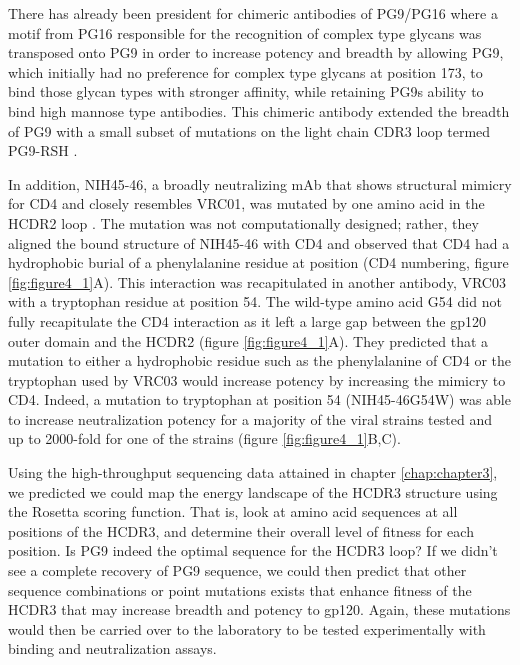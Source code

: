 There has already been president for chimeric antibodies of PG9/PG16 where a motif from PG16 responsible for the recognition of complex type glycans was transposed onto PG9 in order to increase potency and breadth by allowing PG9, which initially had no preference for complex type glycans at position 173, to bind those glycan types with stronger affinity, while retaining PG9s ability to bind high mannose type antibodies. This chimeric antibody extended the breadth of PG9 with a small subset of mutations on the light chain CDR3 loop termed PG9-RSH \citep{Pancera:2013ev}. 

In addition, NIH45-46, a broadly neutralizing mAb that shows structural mimicry for CD4 and closely resembles VRC01, was mutated by one amino acid in the HCDR2 loop \citep{Scheid:2011js,Diskin:2011hl}. The mutation was not computationally designed; rather, they aligned the bound structure of NIH45-46 with CD4 and observed that CD4 had a hydrophobic burial of a phenylalanine residue at position (CD4 numbering, figure \ref{fig:figure4_1}A). This interaction was recapitulated in another antibody, VRC03 with a tryptophan residue at position 54. The wild-type amino acid G54 did not fully recapitulate the CD4 interaction as it left a large gap between the gp120 outer domain and the HCDR2 (figure \ref{fig:figure4_1}A). They predicted that a mutation to either a hydrophobic residue such as the phenylalanine of CD4 or the tryptophan used by VRC03 would increase potency by increasing the mimicry to CD4. Indeed, a mutation to tryptophan at position 54 (NIH45-46G54W) was able to increase neutralization potency for a majority of the viral strains tested and up to 2000-fold for one of the strains (figure \ref{fig:figure4_1}B,C). 

Using the high-throughput sequencing data attained in chapter \ref{chap:chapter3}, we predicted we could map the energy landscape of the HCDR3 structure using the Rosetta scoring function. That is, look at amino acid sequences at all positions of the HCDR3, and determine their overall level of fitness for each position. Is PG9 indeed the optimal sequence for the HCDR3 loop? If we didn't see a complete recovery of PG9 sequence, we could then predict that other sequence combinations or point mutations exists that enhance fitness of the HCDR3 that may increase breadth and potency to gp120. Again, these mutations would then be carried over to the laboratory to be tested experimentally with binding and neutralization assays. 

